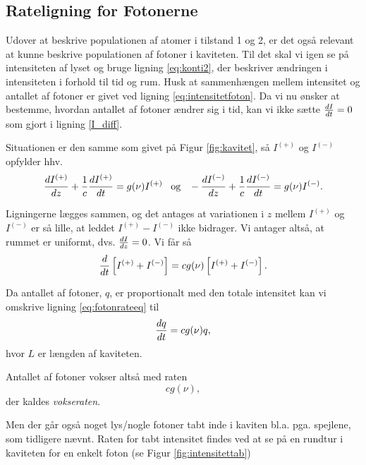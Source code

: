 \subsection{Rateligning for Fotonerne}
Udover at beskrive populationen af atomer i tilstand 1 og 2, er det også relevant at kunne beskrive populationen af fotoner i kaviteten. Til det skal vi igen se på intensiteten af lyset og bruge ligning \ref{eq:konti2}, der beskriver ændringen i intensiteten i forhold til tid og rum. Husk at sammenhængen mellem intensitet og antallet af fotoner er givet ved ligning \ref{eq:intensitetfoton}. Da vi nu ønsker at bestemme, hvordan antallet af fotoner ændrer sig i tid, kan vi ikke sætte ${d{I} \over d{t}}=0$ som gjort i ligning \ref{I_diff}. 

Situationen er den samme som givet på Figur \ref{fig:kavitet}, så $I^{(+)}$ og $I^{(-)}$ opfylder hhv. 
\begin{equation}
{d{I^{(+)}} \over d{z}} + \frac{1}{c} {d{I^{(+)}} \over d{t}} = g(\nu)I^{(+)} \,\,\,\,\, \text{og} \,\,\,\,\, -{d{I^{(-)}} \over d{z}} + \frac{1}{c} {d{I^{(-)}} \over d{t}} = g(\nu)I^{(-)}.
\end{equation}

Ligningerne lægges sammen, og det antages at variationen i $z$ mellem $I^{(+)}$ og $I^{(-)}$ er så lille, at leddet $I^{(+)}-I^{(-)}$ ikke bidrager. Vi antager altså, at rummet er uniformt, dvs. ${d{I} \over d{z}}=0$. Vi får så 
\begin{equation}
{d{} \over d{t}}\left[I^{(+)} + I^{(-)}\right] = cg(\nu)\left[I^{(+)}+I^{(-)}\right]. 
\label{eq:fotonrateeq}
\end{equation}

Da antallet af fotoner, $q$, er proportionalt med den totale intensitet kan vi omskrive ligning \ref{eq:fotonrateeq} til 
\begin{equation}
{d{q} \over d{t}} = cg(\nu)q,
\end{equation}
hvor $L$ er længden af kaviteten.

Antallet af fotoner vokser altså med raten 
\begin{equation}
cg(\nu),
\end{equation}
der kaldes \emph{vokseraten}. 

Men der går også noget lys/nogle fotoner tabt inde i kaviten bl.a. pga. spejlene, som tidligere nævnt. 
Raten for tabt intensitet findes ved at se på en rundtur i kaviteten for en enkelt foton (se Figur \ref{fig:intensitettab})

